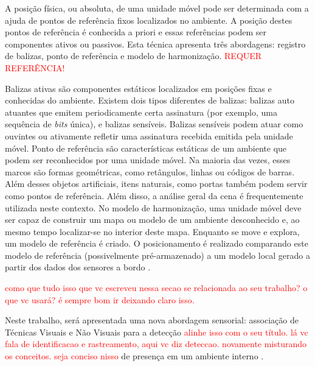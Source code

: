 A posição física, ou absoluta, de uma unidade móvel pode ser determinada com a ajuda de pontos de referência fixos localizados no ambiente. A posição destes pontos de referência é conhecida a priori e essas referências podem ser componentes ativos ou passivos. Esta técnica apresenta três abordagens: registro de balizas, ponto de referência e modelo de harmonização.
 \textcolor{red}{REQUER REFERÊNCIA!}

Balizas ativas são componentes estáticos localizados em posições fixas e conhecidas do ambiente. Existem dois tipos diferentes de balizas: balizas auto atuantes que emitem periodicamente certa assinatura (por exemplo, uma sequência de \textit{bits} única), e balizas sensíveis. Balizas sensíveis podem atuar como ouvintes ou ativamente refletir uma assinatura recebida emitida pela unidade móvel. Ponto de referência são características estáticas de um ambiente que podem ser reconhecidos por uma unidade móvel. Na maioria das vezes, esses marcos são formas geométricas, como retângulos, linhas ou códigos de barras. Além desses objetos artificiais, itens naturais, como portas também podem servir como pontos de referência. Além disso, a análise geral da cena é frequentemente utilizada neste contexto. No modelo de harmonização, uma unidade móvel deve ser capaz de construir um mapa ou modelo de um ambiente desconhecido e, ao mesmo tempo localizar-se no interior deste mapa. Enquanto se move e explora, um modelo de referência é criado. O posicionamento é realizado comparando este modelo de referência (possivelmente pré-armazenado) a um modelo local gerado a partir dos dados dos sensores a bordo \cite{linde2006aspects}.

\textcolor{red}{como que tudo isso que vc escreveu nessa secao se relacionada ao seu trabalho? o que vc usará? é sempre bom ir deixando claro isso.}


 Neste trabalho, será apresentada uma nova abordagem sensorial: associação de Técnicas Visuais e Não Visuais para a detecção \textcolor{red}{alinhe isso com o seu título. lá vc fala de identificacao e rastreamento, aqui vc diz deteccao. novamente misturando os conceitos. seja conciso nisso} de presença em um ambiente interno \cite{yun2014human}.